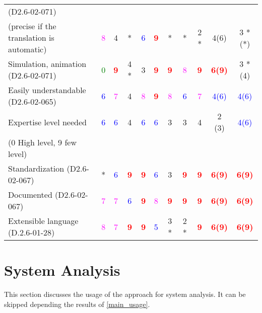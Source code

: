\begin{tabular}{|l | c | c | c | c | c | c | c | c | c | c |}
(D2.6-02-071)  &  &      &  &  & & &  &    &   &   \\
(precise if the translation is automatic)  & \textcolor{magenta}{8} & 4  &  * & \textcolor{blue}{6} & \textcolor{red}{\textbf{9}} & * & * & 2    * &  4(6) & 3 *(*) \\
\hline
Simulation, animation (D2.6-02-071)  & \textcolor{green}{0} & \textcolor{red}{\textbf{9}} & 4    * & 3     & \textcolor{red}{\textbf{9}} & \textcolor{red}{\textbf{9}} & \textcolor{magenta}{8} & \textcolor{red}{\textbf{9}} & \textcolor{red}{\textbf{6(9)}}  & 3 *(4) \\
\hline
Easily understandable (D2.6-02-065)  & \textcolor{blue}{6} & \textcolor{magenta}{7} & 4     & \textcolor{magenta}{8} & \textcolor{red}{\textbf{9}} & \textcolor{magenta}{8}  & \textcolor{blue}{6} & \textcolor{magenta}{7} & \textcolor{blue}{4(6)}  & \textcolor{blue}{4(6)}  \\
\hline
Expertise level needed  & \textcolor{blue}{6} & \textcolor{blue}{6} & 4     & \textcolor{blue}{6} & \textcolor{blue}{6} & 3     & 3     & 4     & 2 (3) & \textcolor{blue}{4(6)}  \\
(0 High level, 9 few level)   &  &      &  &  & & &  &    &   &   \\
\hline
Standardization (D2.6-02-067)  & * & \textcolor{blue}{6} & \textcolor{red}{\textbf{9}} & \textcolor{red}{\textbf{9}} & \textcolor{blue}{6} & 3     & \textcolor{red}{\textbf{9}} & \textcolor{red}{\textbf{9}} & \textcolor{red}{\textbf{6(9)}}  & \textcolor{red}{\textbf{6(9)}}  \\
\hline
Documented (D2.6-02-067)  & \textcolor{magenta}{7} & \textcolor{magenta}{7} & \textcolor{blue}{6} & \textcolor{red}{\textbf{9}} & \textcolor{magenta}{8} & \textcolor{red}{\textbf{9}} & \textcolor{red}{\textbf{9}} & \textcolor{red}{\textbf{9}} & \textcolor{red}{\textbf{6(9)}}  & \textcolor{red}{\textbf{6(9)}}  \\
\hline
Extensible language (D.2.6-01-28)  & \textcolor{magenta}{8} & \textcolor{magenta}{7} & \textcolor{red}{\textbf{9}} & \textcolor{red}{\textbf{9}} & \textcolor{blue}{5} & 3    * & 2    * & \textcolor{red}{\textbf{9}} & \textcolor{red}{\textbf{6(9)}}   & \textcolor{red}{\textbf{6(9)}}  \\
\hline
\end{tabular}


\section{System Analysis}
This section discusses the usage of the approach for system analysis.
It can be skipped depending the results of \ref{main_usage}.

